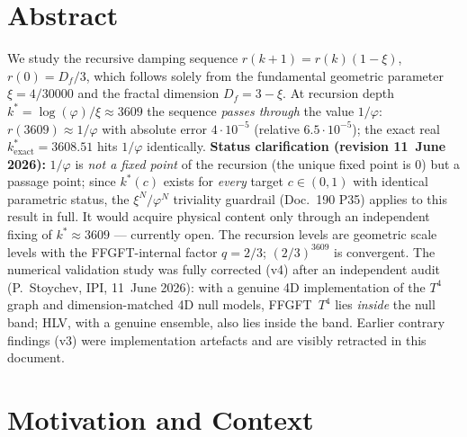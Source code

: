 
\newtheorem*{observationstar}{Observation}

\section*{Abstract}
We study the recursive damping sequence
$r(k{+}1)=r(k)(1-\xi)$, $r(0)=D_f/3$, which follows solely from the
fundamental geometric parameter $\xi = 4/30000$ and the fractal
dimension $D_f = 3-\xi$. At recursion depth
$k^* = \log(\varphi)/\xi \approx 3609$ the sequence \emph{passes
through} the value $1/\varphi$: $r(3609) \approx 1/\varphi$ with
absolute error $4{\cdot}10^{-5}$ (relative $6.5{\cdot}10^{-5}$); the
exact real $k^*_\mathrm{exact}=3608.51$ hits $1/\varphi$ identically.
\textbf{Status clarification (revision 11~June 2026):} $1/\varphi$ is
\emph{not a fixed point} of the recursion (the unique fixed point is
$0$) but a passage point; since $k^*(c)$ exists for \emph{every}
target $c\in(0,1)$ with identical parametric status, the
$\xi^N/\varphi^N$ triviality guardrail (Doc.~190 P35) applies to this
result in full. It would acquire physical content only through an
independent fixing of $k^*\approx 3609$ --- currently open.
The recursion levels are geometric scale levels with the FFGFT-internal
factor $q = 2/3$; $(2/3)^{3609}$ is convergent.
The numerical validation study was fully corrected (v4) after an
independent audit (P.~Stoychev, IPI, 11~June 2026): with a genuine 4D
implementation of the $T^4$ graph and dimension-matched 4D null models,
FFGFT~$T^4$ lies \emph{inside} the null band; HLV, with a genuine
ensemble, also lies inside the band. Earlier contrary findings (v3)
were implementation artefacts and are visibly retracted in this
document.

\section{Motivation and Context}

